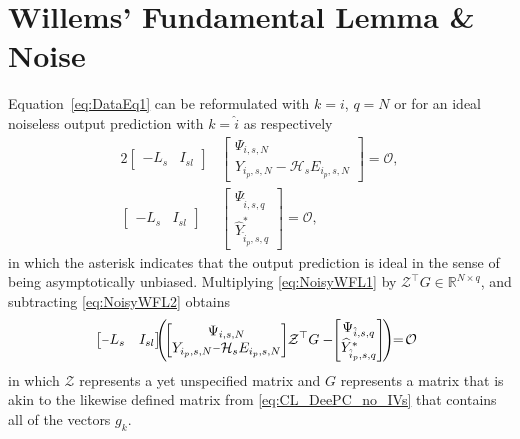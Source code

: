 \section{Willems' Fundamental Lemma \& Noise}
Equation~\eqref{eq:DataEq1} can be reformulated with $k=i$, $q=N$ or for an ideal noiseless output prediction with $k=\hat{i}$ as respectively
\begin{alignat}{2}
    \begin{bmatrix}
        -L_s & I_{sl}
    \end{bmatrix}&
    \begin{bmatrix}
        \Psi_{i,s,N}\\
        Y_{i_p,s,N}-\mathcal{H}_s E_{i_p,s,N}
    \end{bmatrix} = \mathcal{O},\label{eq:NoisyWFL1}\\%
    \begin{bmatrix}
        -L_s & I_{sl}
    \end{bmatrix}&
    \begin{bmatrix}
        \Psi_{\hat{i},s,q}\\
        \widehat{Y}^*_{\hat{i}_p,s,q}
    \end{bmatrix} = \mathcal{O}, \label{eq:NoisyWFL2}
\end{alignat}
in which the asterisk indicates that the output prediction is ideal in the sense of being asymptotically unbiased. Multiplying \eqref{eq:NoisyWFL1} by $\mathcal{Z}^\top G\in\mathbb{R}^{N\times q}$, and subtracting \eqref{eq:NoisyWFL2} obtains
\begin{align}\label{eq:NoisyWFL3}
    \mkern-14mu\begin{bmatrix}
        \shortminus L_s & I_{sl}
    \end{bmatrix}
    \mkern-9mu\left(\mkern-3mu%
    \begin{bmatrix}
        \Psi_{i,s,N}\\
        Y_{i_p,s,N}\shortminus\mathcal{H}_s E_{i_p,s,N}
    \end{bmatrix}%
    \mkern-4mu\mathcal{Z}^\top G%
    -%
    \mkern-5mu\begin{bmatrix}
        \Psi_{\hat{i},s,q}\\
        \widehat{Y}^*_{\hat{i}_p,s,q}
    \end{bmatrix}\mkern-3mu\right)\mkern-6mu=\mkern-3mu\mathcal{O}\mkern-5mu%
\end{align}
in which $\mathcal{Z}$ represents a yet unspecified matrix and $G$ represents a matrix that is akin to the likewise defined matrix from \eqref{eq:CL_DeePC_no_IVs} that contains all of the vectors $g_k$.

